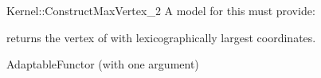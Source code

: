 \begin{ccRefFunctionObjectConcept}{Kernel::ConstructMaxVertex_2}
A model for this must provide:




 {returns the vertex of
   with lexicographically largest coordinates.}


\ccRefines
AdaptableFunctor (with one argument)

\ccSeeAlso
{}

\end{ccRefFunctionObjectConcept}
